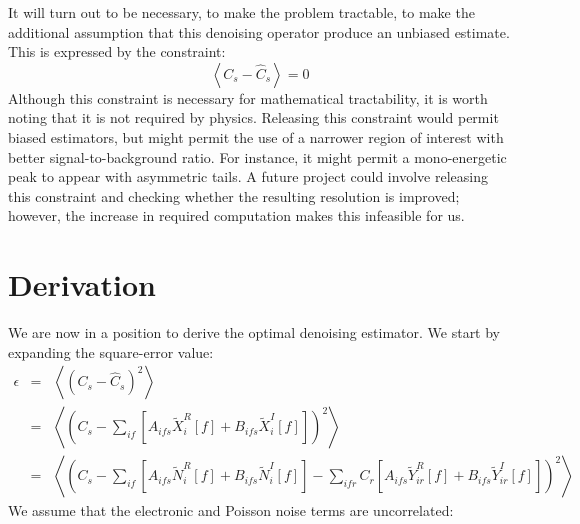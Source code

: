 It will turn out to be necessary, to make the problem tractable, to make the additional assumption that this denoising operator produce an unbiased estimate.  This is expressed by the constraint:
\[ \left< C_s - \widehat{C}_s\right> = 0 \]
Although this constraint is necessary for mathematical tractability, it is worth noting that it is not required by physics.  Releasing this constraint would permit biased estimators, but might permit the use of a narrower region of interest with better signal-to-background ratio.  For instance, it might permit a mono-energetic peak to appear with asymmetric tails.  A future project could involve releasing this constraint and checking whether the resulting resolution is improved; however, the increase in required computation makes this infeasible for us.

\section{Derivation}

We are now in a position to derive the optimal denoising estimator.  We start by expanding the square-error value:
\[
\begin{array}{rcl}
\epsilon &=& \left< \left(C_s - \widehat{C}_s\right)^2\right> \\

&=& \left<\left(C_s - \sum_{if} \left[A_{ifs} \widetilde{X}_i^R[f] + B_{ifs} \widetilde{X}_i^I[f]\right]\right)^2\right> \\

&=& \left<\left(C_s - \sum_{if} \left[A_{ifs}\widetilde{N}_i^R[f] + B_{ifs}\widetilde{N}_i^I[f]\right]
                    - \sum_{ifr}C_r\left[A_{ifs}\widetilde{Y}_{ir}^R[f] + B_{ifs}\widetilde{Y}_{ir}^I[f]\right]
    \right)^2\right>
\end{array}
\]
We assume that the electronic and Poisson noise terms are uncorrelated:
%



